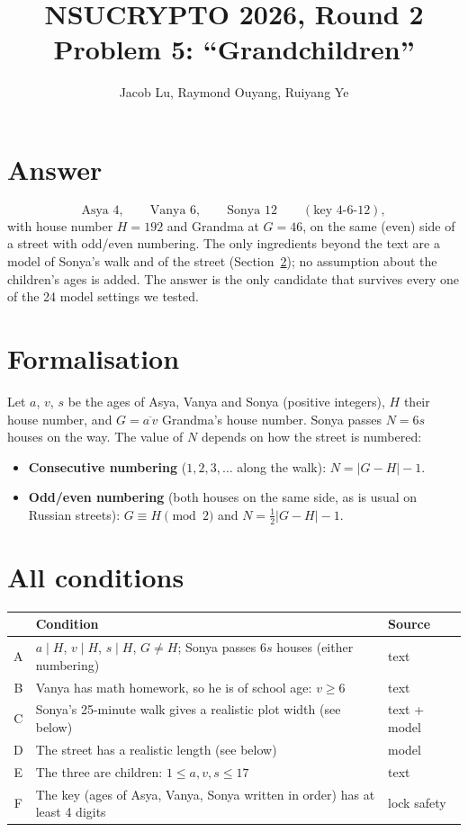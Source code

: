 \documentclass[11pt,a4paper]{article}
\title{NSUCRYPTO 2026, Round 2\\Problem 5: ``Grandchildren''}
\date{}
\author{Jacob Lu, Raymond Ouyang, Ruiyang Ye}
\begin{document}
\maketitle

\section*{Answer}

\[
\text{Asya } 4,\qquad \text{Vanya } 6,\qquad \text{Sonya } 12 \qquad(\text{key } 4\text{-}6\text{-}12),
\]
with house number $H=192$ and Grandma at $G=46$, on the same (even) side of a street with odd/even numbering.
The only ingredients beyond the text are a model of Sonya's walk and of the street (Section~\ref{sec:cond}); no
assumption about the children's ages is added. The answer is the only candidate that survives every one of the
24 model settings we tested.

\section{Formalisation}

Let $a$, $v$, $s$ be the ages of Asya, Vanya and Sonya (positive integers), $H$ their house number, and
$G=\overline{a\,v}$ Grandma's house number. Sonya passes $N=6s$ houses on the way. The value of $N$ depends on
how the street is numbered:
\begin{itemize}
  \item \textbf{Consecutive numbering} ($1,2,3,\dots$ along the walk): $N=|G-H|-1$.
  \item \textbf{Odd/even numbering} (both houses on the same side, as is usual on Russian streets):
  $G\equiv H\pmod 2$ and $N=\tfrac12|G-H|-1$.
\end{itemize}

\section{All conditions}\label{sec:cond}

\begin{center}
\begin{tabular}{@{}cll@{}}
\toprule
& Condition & Source \\
\midrule
A & $a\mid H$, $v\mid H$, $s\mid H$, $G\neq H$; Sonya passes $6s$ houses (either numbering) & text \\
B & Vanya has math homework, so he is of school age: $v\ge 6$ & text \\
C & Sonya's 25-minute walk gives a realistic plot width (see below) & text + model \\
D & The street has a realistic length (see below) & model \\
E & The three are children: $1\le a,v,s\le 17$ & text \\
F & The key (ages of Asya, Vanya, Sonya written in order) has at least 4 digits & lock safety \\
\bottomrule
\end{tabular}
\end{center}
\end{document}
